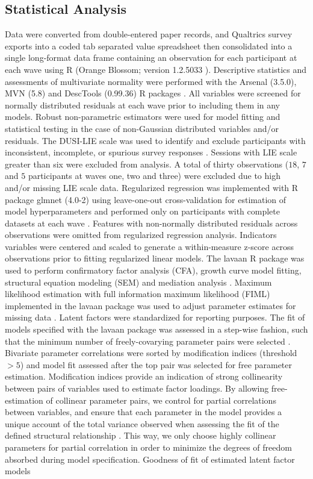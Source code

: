 \documentclass[utf8]{article}
\begin{document}
\subsection*{Statistical Analysis}
Data were converted from double-entered paper records, and Qualtrics survey exports into a coded tab separated value spreadsheet then consolidated into a single long-format data frame containing an observation for each participant at each wave using R (Orange Blossom; version 1.2.5033 \cite{R}). Descriptive statistics and assessments of multivariate normality were performed with the Arsenal (3.5.0), MVN (5.8) and DescTools (0.99.36) R packages \citep{MVN,DescTools}. All variables were screened for normally distributed residuals at each wave prior to including them in any models. Robust non-parametric estimators were used for model fitting and statistical testing in the case of non-Gaussian distributed variables and/or residuals. The DUSI-LIE scale was used to identify and exclude participants with inconsistent, incomplete, or spurious survey responses \citep{dalla2003effects}. Sessions with LIE scale greater than six were excluded from analysis. A total of thirty observations ($18$, $7$ and $5$ participants at waves one, two and three) were excluded due to high and/or missing LIE scale data. Regularized regression was implemented with R package glmnet (4.0-2) using leave-one-out cross-validation for estimation of model hyperparameters and performed only on participants with complete datasets at each wave \citep{friedman2009glmnet, FriedmanHastieTibshirani2010}. Features with non-normally distributed residuals across observations were omitted from regularized regression analysis. Indicators variables were centered and scaled to generate a within-measure z-score across observations prior to fitting regularized linear models. The lavaan R package was used to perform confirmatory factor analysis (CFA), growth curve model fitting, structural equation modeling (SEM) and mediation analysis \citep{Lavaan}. Maximum likelihood estimation with full information maximum likelihood (FIML) implemented in the lavaan package was used to adjust parameter estimates for missing data \citep{cham2017full}. Latent factors were standardized for reporting purposes. The fit of models specified with the lavaan package was assessed in a step-wise fashion, such that the minimum number of freely-covarying parameter pairs were selected \citep{schreiber2006reporting}. Bivariate parameter correlations were sorted by modification indices (threshold $>5$) and model fit assessed after the top pair was selected for free parameter estimation. Modification indices provide an indication of strong collinearity between pairs of variables used to estimate factor loadings. By allowing free-estimation of collinear parameter pairs, we control for partial correlations between variables, and ensure that each parameter in the model provides a unique account of the total variance observed when assessing the fit of the defined structural relationship \citep{sobel1997measurement}. This way, we only choose highly collinear parameters for partial correlation in order to minimize the degrees of freedom absorbed during model specification. Goodness of fit of estimated latent factor models 
\end{document}
